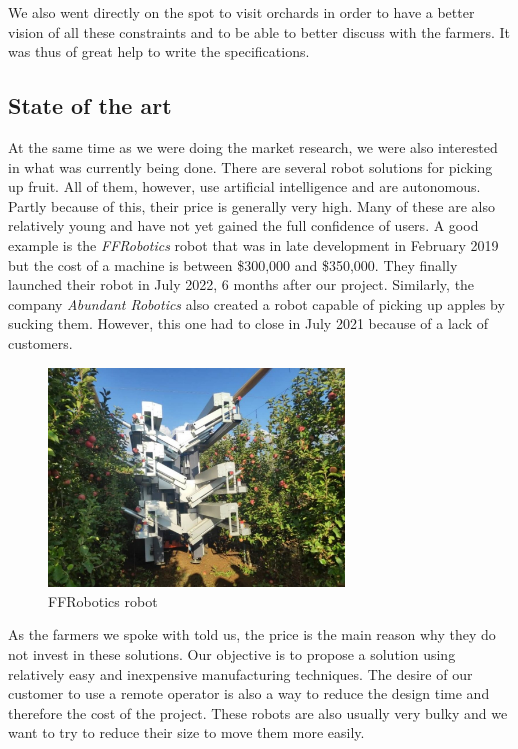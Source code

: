 \bigbreak
We also went directly on the spot to visit orchards in order to have a better vision of all these constraints and to be able to better discuss with the farmers. It was thus of great help to write the specifications. 

\subsection{State of the art}
\label{StaArt}
At the same time as we were doing the market research, we were also interested in what was currently being done. There are several robot solutions for picking up fruit. All of them, however, use artificial intelligence and are autonomous. Partly because of this, their price is generally very high. Many of these are also relatively young and have not yet gained the full confidence of users. A good example is the \textit{FFRobotics} robot\cite{FFRobotics} that was in late development in February 2019 but the cost of a machine is between \$300,000 and \$350,000. They finally launched their robot in July 2022, 6 months after our project. Similarly, the company \textit{Abundant Robotics}\cite{Abundant} also created a robot capable of picking up apples by sucking them. However, this one had to close in July 2021 because of a lack of customers.
\begin{figure}[ht]
    \centering
    \includegraphics[width=0.7\textwidth]{Images/Section01/ffRobotics.png}
    \caption{FFRobotics robot}
    \label{fig:ffRobotics}
\end{figure}

\bigbreak
As the farmers we spoke with told us, the price is the main reason why they do not invest in these solutions. Our objective is to propose a solution using relatively easy and inexpensive manufacturing techniques. The desire of our customer to use a remote operator is also a way to reduce the design time and therefore the cost of the project. These robots are also usually very bulky and we want to try to reduce their size to move them more easily.

